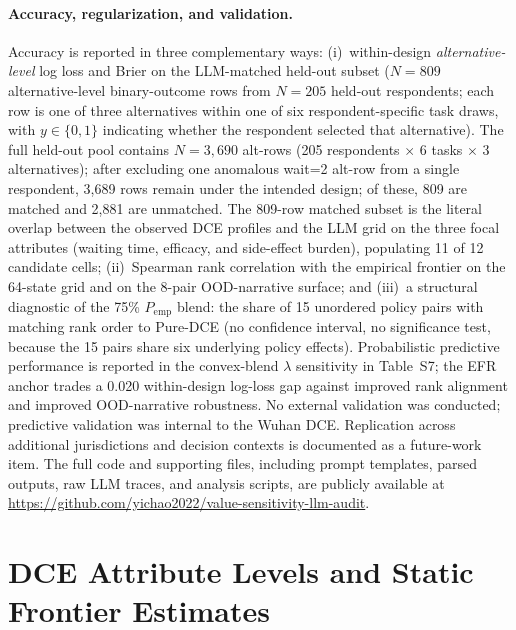 \documentclass[11pt]{article}
\begin{document}
\paragraph{Accuracy, regularization, and validation.}
Accuracy is reported in three complementary ways: (i)~within-design \emph{alternative-level} log loss and Brier on the LLM-matched held-out subset ($N=809$ alternative-level binary-outcome rows from $N=205$ held-out respondents; each row is one of three alternatives within one of six respondent-specific task draws, with $y \in \{0,1\}$ indicating whether the respondent selected that alternative). The full held-out pool contains $N=3{,}690$ alt-rows (205 respondents $\times$ 6 tasks $\times$ 3 alternatives); after excluding one anomalous wait=2 alt-row from a single respondent, 3{,}689 rows remain under the intended design; of these, 809 are matched and 2{,}881 are unmatched. The 809-row matched subset is the literal overlap between the observed DCE profiles and the LLM grid on the three focal attributes (waiting time, efficacy, and side-effect burden), populating 11 of 12 candidate cells; (ii)~Spearman rank correlation with the empirical frontier on the 64-state grid and on the 8-pair OOD-narrative surface; and (iii)~a structural diagnostic of the 75\% $P_{\text{emp}}$ blend: the share of 15 unordered policy pairs with matching rank order to Pure-DCE (no confidence interval, no significance test, because the 15 pairs share six underlying policy effects). Probabilistic predictive performance is reported in the convex-blend $\lambda$ sensitivity in Table~S7; the EFR anchor trades a 0.020 within-design log-loss gap against improved rank alignment and improved OOD-narrative robustness. No external validation was conducted; predictive validation was internal to the Wuhan DCE. Replication across additional jurisdictions and decision contexts is documented as a future-work item. The full code and supporting files, including prompt templates, parsed outputs, raw LLM traces, and analysis scripts, are publicly available at \url{https://github.com/yichao2022/value-sensitivity-llm-audit}.

\section{DCE Attribute Levels and Static Frontier Estimates}
\label{app:dce_attributes}
\end{document}
